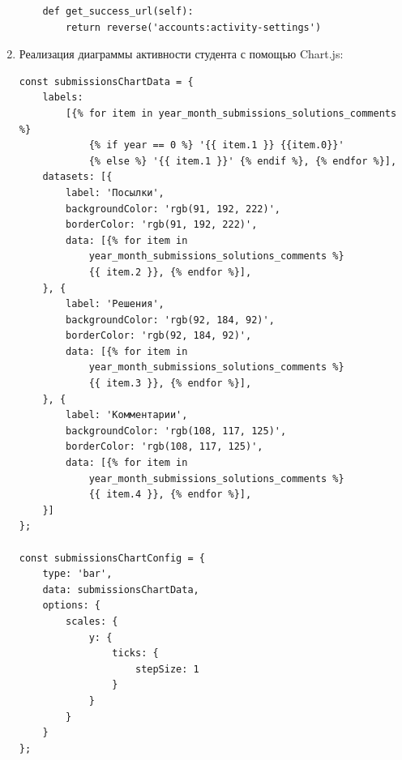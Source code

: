 \documentclass[12pt, a4paper, oneside]{article}
\begin{document}
\begin{enumerate}[wide, labelindent=0pt]
{\begin{verbatim}
    def get_success_url(self):
        return reverse('accounts:activity-settings')        
        \end{verbatim}
    }
    \item {
        Реализация диаграммы активности студента с помощью Chart.js:\label{code:diagram}
        \begin{verbatim}
const submissionsChartData = {
    labels: 
        [{% for item in year_month_submissions_solutions_comments %} 
            {% if year == 0 %} '{{ item.1 }} {{item.0}}' 
            {% else %} '{{ item.1 }}' {% endif %}, {% endfor %}],
    datasets: [{
        label: 'Посылки',
        backgroundColor: 'rgb(91, 192, 222)',
        borderColor: 'rgb(91, 192, 222)',
        data: [{% for item in 
            year_month_submissions_solutions_comments %} 
            {{ item.2 }}, {% endfor %}],
    }, {
        label: 'Решения',
        backgroundColor: 'rgb(92, 184, 92)',
        borderColor: 'rgb(92, 184, 92)',
        data: [{% for item in 
            year_month_submissions_solutions_comments %} 
            {{ item.3 }}, {% endfor %}],
    }, {
        label: 'Комментарии',
        backgroundColor: 'rgb(108, 117, 125)',
        borderColor: 'rgb(108, 117, 125)',
        data: [{% for item in 
            year_month_submissions_solutions_comments %} 
            {{ item.4 }}, {% endfor %}],
    }]
};

const submissionsChartConfig = {
    type: 'bar',
    data: submissionsChartData,
    options: {
        scales: {
            y: {
                ticks: {
                    stepSize: 1
                }
            }
        }
    }
};


\end{verbatim}}
\end{enumerate}
\end{document}

